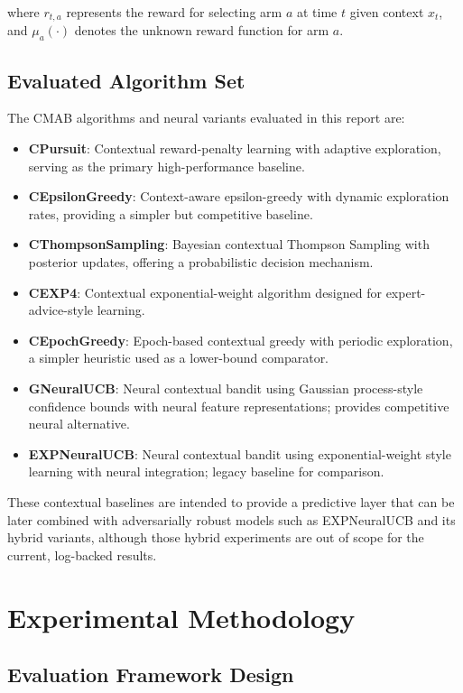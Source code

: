 \documentclass[12pt,a4paper]{article}
\begin{document}
where $r_{t,a}$ represents the reward for selecting arm $a$ at time $t$ given context $x_t$, and $\mu_a(\cdot)$ denotes the unknown reward function for arm $a$.

\subsection{Evaluated Algorithm Set}

The CMAB algorithms and neural variants evaluated in this report are:

\begin{itemize}
\item \textbf{CPursuit}: Contextual reward-penalty learning with adaptive exploration, serving as the primary high-performance baseline.
\item \textbf{CEpsilonGreedy}: Context-aware epsilon-greedy with dynamic exploration rates, providing a simpler but competitive baseline.
\item \textbf{CThompsonSampling}: Bayesian contextual Thompson Sampling with posterior updates, offering a probabilistic decision mechanism.
\item \textbf{CEXP4}: Contextual exponential-weight algorithm designed for expert-advice-style learning.
\item \textbf{CEpochGreedy}: Epoch-based contextual greedy with periodic exploration, a simpler heuristic used as a lower-bound comparator.
\item \textbf{GNeuralUCB}: Neural contextual bandit using Gaussian process-style confidence bounds with neural feature representations; provides competitive neural alternative.
\item \textbf{EXPNeuralUCB}: Neural contextual bandit using exponential-weight style learning with neural integration; legacy baseline for comparison.
\end{itemize}

These contextual baselines are intended to provide a predictive layer that can be later combined with adversarially robust models such as EXPNeuralUCB and its hybrid variants, although those hybrid experiments are out of scope for the current, log-backed results.

\section{Experimental Methodology}

\subsection{Evaluation Framework Design}
\end{document}
